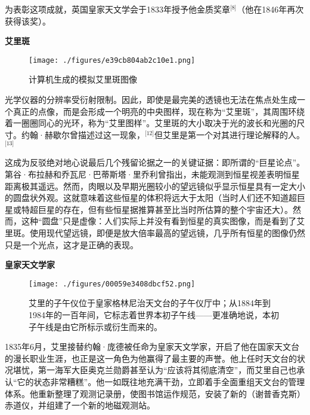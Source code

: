 为表彰这项成就，英国皇家天文学会于1833年授予他金质奖章\(^\text{[8]}\)（他在1846年再次获得该奖）。

\textbf{艾里斑}
\begin{figure}[ht]
\centering
\texttt{[image: ./figures/e39cb804ab2c10e1.png]}
\caption{计算机生成的模拟艾里斑图像} \label{fig_AL_3}
\end{figure}
光学仪器的分辨率受衍射限制。因此，即使是最完美的透镜也无法在焦点处生成一个真正的点像，而是会形成一个明亮的中央图样，现在称为“艾里斑”，其周围环绕着一圈圈同心的光环，称为“艾里图样”。艾里斑的大小取决于光的波长和光圈的尺寸。约翰·赫歇尔曾描述过这一现象，\(^\text{[12]}\)但艾里是第一个对其进行理论解释的人。\(^\text{[13]}\)

这成为反驳绝对地心说最后几个残留论据之一的关键证据：即所谓的“巨星论点”。第谷·布拉赫和乔瓦尼·巴蒂斯塔·里乔利曾指出，未能观测到恒星视差表明恒星距离极其遥远。然而，肉眼以及早期光圈较小的望远镜似乎显示恒星具有一定大小的圆盘状外观。这就意味着这些恒星的体积将远大于太阳（当时人们还不知道超巨星或特超巨星的存在，但有些恒星据推算甚至比当时所估算的整个宇宙还大）。然而，这种“圆盘”只是虚像：人们实际上并没有看到恒星的真实图像，而是看到了艾里斑。使用现代望远镜，即便是放大倍率最高的望远镜，几乎所有恒星的图像仍然只是一个光点，这才是正确的表现。

\textbf{皇家天文学家}
\begin{figure}[ht]
\centering
\texttt{[image: ./figures/00059e3408dbcf52.png]}
\caption{艾里的子午仪位于皇家格林尼治天文台的子午仪厅中；从1884年到1984年的一百年间，它标志着世界本初子午线——更准确地说，本初子午线是由它所标示或衍生而来的。} \label{fig_AL_4}
\end{figure}
1835年6月，艾里接替约翰·庞德被任命为皇家天文学家，开启了他在国家天文台的漫长职业生涯，也正是这一角色为他赢得了最主要的声誉。他上任时天文台的状况堪忧，第一海军大臣奥克兰勋爵甚至认为“应该将其彻底清空”，而艾里自己也承认“它的状态非常糟糕”。他一如既往地充满干劲，立即着手全面重组天文台的管理体系。他重新整理了观测记录册，使图书馆运作规范，安装了新的（谢普香克斯）赤道仪，并组建了一个新的地磁观测站。

